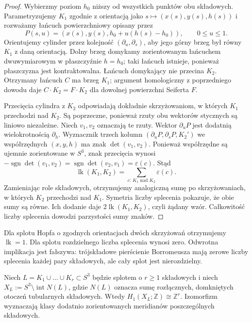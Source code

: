 \begin{proof}
Wybierzmy poziom $h_0$ niższy od wszystkich punktów obu
składowych. Parametryzujemy $K_1$ zgodnie z orientacją jako
$s\mapsto (x(s),y(s),h(s))$ i rozważamy łańcuch powierzchniowy
opisany przez
\[
P(s,u)=(x(s),y(s),h_0+u(h(s)-h_0)),\qquad 0\leq u\leq1.
\]
Orientujemy cylinder przez kolejność $(\partial_u,\partial_s)$,
aby jego górny brzeg był równy $K_1$ z daną orientacją.
Dolny brzeg domykamy zorientowanym łańcuchem dwuwymiarowym
w płaszczyźnie $h=h_0$; taki łańcuch istnieje, ponieważ
płaszczyzna jest kontraktowalna. Łańcuch domykający nie przecina
$K_2$. Otrzymany łańcuch $C$ ma brzeg $K_1$; argument
homologiczny z poprzedniego dowodu daje
$C\cdot K_2=F\cdot K_2$ dla dowolnej powierzchni Seiferta $F$.

Przecięcia cylindra z $K_2$ odpowiadają dokładnie
skrzyżowaniom, w których $K_1$ przechodzi nad $K_2$.
Są poprzeczne, ponieważ rzuty obu wektorów stycznych
są liniowo niezależne. Niech $v_1,v_2$ oznaczają te rzuty.
Wektor $\partial_u P$ jest dodatnią wielokrotnością
$\partial_h$. Wyznacznik trzech kolumn
$(\partial_u P,\partial_s P,K_2')$ we współrzędnych
$(x,y,h)$ ma znak $\det(v_1,v_2)$.
Ponieważ współrzędne są ujemnie zorientowane w $S^3$,
znak przecięcia wynosi
$-\operatorname{sgn}\det(v_1,v_2)
=\operatorname{sgn}\det(v_2,v_1)=\varepsilon(c)$.
Stąd
\[
\operatorname{lk}(K_1,K_2)
=\sum_{c:\,K_1\text{ nad }K_2}\varepsilon(c).
\]
Zamieniając role składowych, otrzymujemy analogiczną sumę
po skrzyżowaniach, w których $K_2$ przechodzi nad $K_1$.
Symetria liczby splecenia pokazuje, że obie sumy są równe.
Ich dodanie daje $2\operatorname{lk}(K_1,K_2)$,
czyli żądany wzór. Całkowitość liczby splecenia dowodzi
parzystości sumy znaków.
\end{proof}

\begin{przyklad}
Dla splotu Hopfa o zgodnych orientacjach dwóch skrzyżowań
otrzymujemy $\operatorname{lk}=1$. Dla splotu rozdzielnego
liczba splecenia wynosi zero. Odwrotna implikacja jest fałszywa:
trójskładowe pierścienie Borromeusza mają zerowe liczby splecenia
każdej pary składowych, ale cały splot jest nierozdzielny.
\end{przyklad}

\begin{twierdzenie}
Niech $L=K_1\cup\dots\cup K_r\subset S^3$ będzie splotem o $r\geq1$
składowych i niech $X_L:=S^3\setminus\operatorname{int}N(L)$,
gdzie $N(L)$ oznacza sumę rozłącznych, domkniętych otoczeń
tubularnych składowych. Wtedy
$H_1(X_L;\mathbb Z)\cong\mathbb Z^r$.
Izomorfizm wyznaczają klasy dodatnio zorientowanych meridianów
poszczególnych składowych.
\end{twierdzenie}

